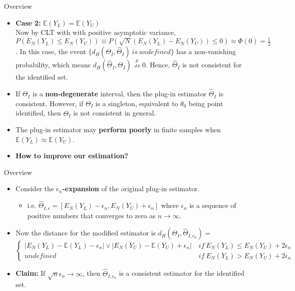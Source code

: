 \documentclass[aspectratio=169]{beamer}  %
\begin{document}
\begin{frame}{Overview}
    \begin{itemize}
        \item  \textbf{Case 2:} $\mathbb{E}(Y_L) = \mathbb{E}(Y_U)$ \\ 
        Now by CLT with with positive asymptotic variance, $P(E_N(Y_L)\leq E_N(Y_U))\equiv P(\sqrt{N}(E_N(Y_L)-E_N(Y_U))\leq0)\approx\Phi(0)=\frac{1}{2}$. In this case, the event $\{d_H(\Theta_I,\hat{\Theta}_{I}) ~is~undefined\}$  has a non-vanishing probability, which means $d_H(\hat{\Theta}_I,\Theta_I)\stackrel{p}\nrightarrow0$. Hence, $\hat{\Theta}_{I}$ is not consistent for the identified set.
        \item If ${\Theta}_{I}$ is a \textbf{non-degenerate} interval, then the plug-in estimator $\hat{\Theta}_{I}$ is consistent. However, if ${\Theta}_{I}$ is a singleton, equivalent to $\theta_0$ being point identified, then $\hat{\Theta}_{I}$ is not consistent in general.
        \item The plug-in estimator may \textbf{perform poorly} in finite samples when $\mathbb{E}(Y_L) \approx \mathbb{E}(Y_U)$.
        \item \textbf{How to improve our estimation?}
    \end{itemize}   
\end{frame}

\begin{frame}{Overview}
    \begin{itemize}
        \item Consider the \textbf{$\epsilon_n$-expansion} of the original plug-in estimator.
        \begin{itemize}
            \item i.e. $\hat{\Theta}_{I,\epsilon} = [E_N(Y_L)-\epsilon_n,E_N(Y_U)+\epsilon_n]$ where $\epsilon_n$ is a sequence of positive numbers that converges to zero as $n\to\infty$.
        \end{itemize}
        \item Now  the distance for the modified estimator is $d_H(\Theta_I,\hat{\Theta}_{I,\epsilon_n})=$
        $$\begin{cases}|E_N(Y_L)-\mathbb{E}(Y_L)-\epsilon_n|\lor|E_N(Y_U)-\mathbb{E}(Y_U)+\epsilon_n|&~if~E_N(Y_L)\leq E_N(Y_U)+2\epsilon_n\\undefined&~if~E_N(Y_L)>E_N(Y_U)+2\epsilon_n\end{cases}$$
        \item \textbf{Claim:} If $\sqrt{n}\epsilon_n\to\infty$, then $\hat{\Theta}_{I,\epsilon_n}$ is a consistent estimator for the identified set. 
    \end{itemize}
\end{frame}
\end{document}
